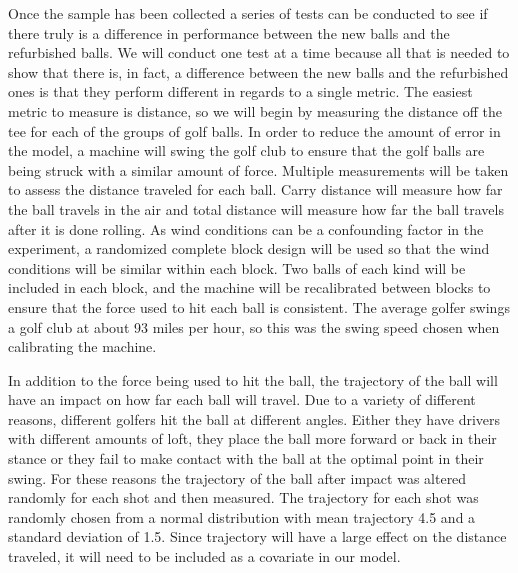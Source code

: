 \documentclass{article}\usepackage[]{graphicx}\usepackage[]{color}
\begin{document}
Once the sample has been collected a series of tests can be conducted to see if there truly is a difference in performance between the new balls and the refurbished balls. We will conduct one test at a time because all that is needed to show that there is, in fact, a difference between the new balls and the refurbished ones is that they perform different in regards to a single metric. The easiest metric to measure is distance, so we will begin by measuring the distance off the tee for each of the groups of golf balls. In order to reduce the amount of error in the model, a machine will swing the golf club to ensure that the golf balls are being struck with a similar amount of force. Multiple measurements will be taken to assess the distance traveled for each ball. Carry distance will measure how far the ball travels in the air and total distance will measure how far the ball travels after it is done rolling. As wind conditions can be a confounding factor in the experiment, a randomized complete block design will be used so that the wind conditions will be similar within each block. Two balls of each kind will be included in each block, and the machine will be recalibrated between blocks to ensure that the force used to hit each ball is consistent. The average golfer swings a golf club at about 93 miles per hour, so this was the swing speed chosen when calibrating the machine.

In addition to the force being used to hit the ball, the trajectory of the ball will have an impact on how far each ball will travel. Due to a variety of different reasons, different golfers hit the ball at different angles. Either they have drivers with different amounts of loft, they place the ball more forward or back in their stance or they fail to make contact with the ball at the optimal point in their swing. For these reasons the trajectory of the ball after impact was altered randomly for each shot and then measured. The trajectory for each shot was randomly chosen from a normal distribution with mean trajectory 4.5 and a standard deviation of 1.5. Since trajectory will have a large effect on the distance traveled, it will need to be included as a covariate in our model. 
\end{document}
